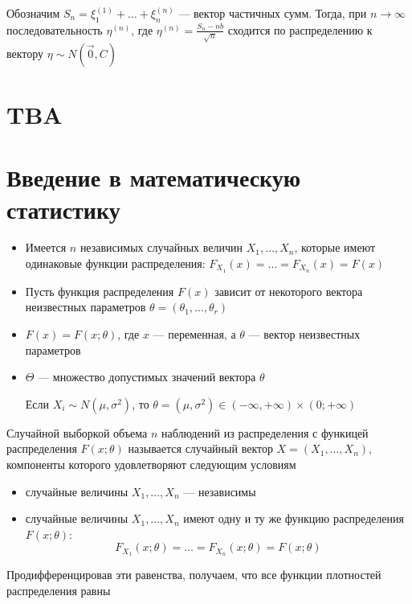 \documentclass[a4paper, 10pt]{article}
\begin{document}
Обозначим $S_n=\xi^{(1)}_1+\ldots+\xi^{(n)}_n$ — вектор частичных сумм. Тогда, при $n\to\infty$ последовательность $\eta^{(n)}$, где $\eta^{(n)}=\frac{S_n-nb}{\sqrt{n}}$ сходится по распределению к вектору $\eta\sim N\left(\overrightarrow{0},C\right)$


\newpage
\section{TBA}

\newpage
\section{Введение в математическую статистику}
\begin{itemize}
    \item Имеется $n$ независимых случайных величин $X_1,\ldots,X_n$, которые имеют одинаковые функции распределения: $F_{X_1}(x)=\ldots=F_{X_n}(x)=F(x)$
    \item Пусть функция распределения $F(x)$ зависит от некоторого вектора неизвестных параметров $\theta=(\theta_1,\ldots,\theta_r)$
    \item $F(x)=F(x;\theta)$, где $x$ — переменная, а $\theta$ — вектор неизвестных параметров
    \item $\Theta$ — множество допустимых значений вектора $\theta$
    
    \ex Если $X_i\sim N(\mu,\sigma^2)$, то $\theta=(\mu,\sigma^2)\in(-\infty,+\infty)\times(0;+\infty)$
\end{itemize}

 Случайной выборкой объема $n$ наблюдений из распределения с функицей распределения $F(x;\theta)$ называется случайный вектор $X=(X_1,\ldots,X_n)$, компоненты которого удовлетворяют следующим условиям
\begin{itemize}
    \item случайные величины $X_1,\ldots,X_n$ — независимы 
    \item случайные величины $X_1,\ldots,X_n$ имеют одну и ту же функцию распределения $F(x;\theta)$:
    \begin{equation*}
        F_{X_1}(x;\theta)=\ldots=F_{X_n}(x;\theta)=F(x;\theta)
    \end{equation*}
\end{itemize}

\comment Продифференцировав эти равенства, получаем, что все функции плотностей распределения равны
\end{document}
